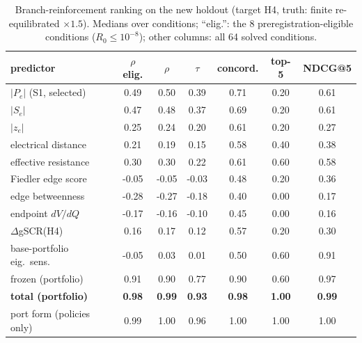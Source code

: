 \begin{table}[!t]
\centering
\caption{Branch-reinforcement ranking on the new holdout (target H4, truth: finite re-equilibrated $\times1.5$). Medians over conditions; ``elig.'': the 8 preregistration-eligible conditions ($R_0\le10^{-8}$); other columns: all 64 solved conditions.}\label{tab:goldb}
\scriptsize
\setlength{\tabcolsep}{2.2pt}
\begin{tabular}{@{}lcccccc@{}}
\toprule
predictor & $\rho$ elig. & $\rho$ & $\tau$ & concord. & top-5 & NDCG@5 \\
\midrule
$|P_e|$ (S1, selected) & 0.49 & 0.50 & 0.39 & 0.71 & 0.20 & 0.61 \\
$|S_e|$ & 0.47 & 0.48 & 0.37 & 0.69 & 0.20 & 0.61 \\
$|z_e|$ & 0.25 & 0.24 & 0.20 & 0.61 & 0.20 & 0.27 \\
electrical distance & 0.21 & 0.19 & 0.15 & 0.58 & 0.40 & 0.38 \\
effective resistance & 0.30 & 0.30 & 0.22 & 0.61 & 0.60 & 0.58 \\
Fiedler edge score & -0.05 & -0.05 & -0.03 & 0.48 & 0.20 & 0.36 \\
edge betweenness & -0.28 & -0.27 & -0.18 & 0.40 & 0.00 & 0.17 \\
endpoint $dV/dQ$ & -0.17 & -0.16 & -0.10 & 0.45 & 0.00 & 0.16 \\
$\Delta$gSCR(H4) & 0.16 & 0.17 & 0.12 & 0.57 & 0.20 & 0.30 \\
\midrule
base-portfolio eig.\ sens. & -0.05 & 0.03 & 0.01 & 0.50 & 0.60 & 0.91 \\
frozen (portfolio) & 0.91 & 0.90 & 0.77 & 0.90 & 0.60 & 0.97 \\
\textbf{total (portfolio)} & \textbf{0.98} & \textbf{0.99} & \textbf{0.93} & \textbf{0.98} & \textbf{1.00} & \textbf{0.99} \\
port form (policies only) & 0.99 & 1.00 & 0.96 & 1.00 & 1.00 & 1.00 \\
\bottomrule
\end{tabular}
\end{table}
